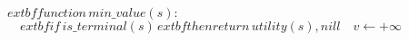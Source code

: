 \documentclass[preview]{standalone}
\begin{document}
\begin{center}
$	extbf{function} \, min\_value(s):$$\quad 	extbf{if} \, is\_terminal(s) \, 	extbf{then return} \, utility(s), nill$$\quad v \leftarrow +\infty$
\end{center}
\end{document}

